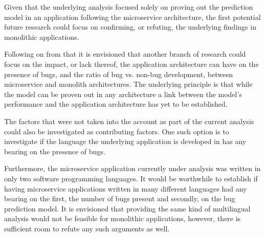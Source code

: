 Given that the underlying analysis focused solely on proving out the prediction model in an application following the microservice architecture, the first potential future research could focus on confirming, or refuting, the underlying findings in monolithic applications. 

Following on from that it is envisioned that another branch of research could focus on the impact, or lack thereof, the application architecture can have on the presence of bugs, and the ratio of bug vs. non-bug development, between microservice and monolith architectures. The underlying principle is that while the model can be proven out in any architecture a link between the model's performance and the application architecture has yet to be established.

The factors that were not taken into the account as part of the current analysis could also be investigated as contributing factors. One such option is to investigate if the language the underlying application is developed in has any bearing on the presence of bugs. 

Furthermore, the microservice application currently under analysis was written in only two software programming languages. It would be worthwhile to establish if having microservice applications written in many different languages had any bearing on the first, the number of bugs present and secondly, on the bug prediction model. It is envisioned that providing the same kind of multilingual analysis would not be feasible for monolithic applications, however, there is sufficient room to refute any such arguments as well.
